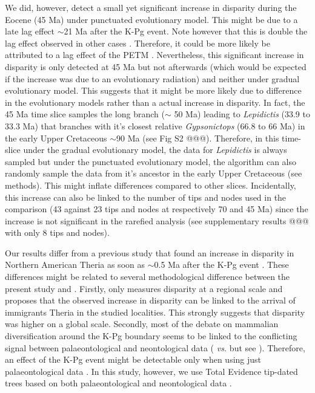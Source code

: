 \documentclass[12pt,letterpaper]{article}
\begin{document}
We did, however, detect a small yet significant increase in disparity during the Eocene (45 Ma) under punctuated evolutionary model.
This might be due to a late lag effect $\sim$21 Ma after the K-Pg event.
Note however that this is double the lag effect observed in other cases \citep{chen2012timing}.
Therefore, it could be more likely be attributed to a lag effect of the PETM \citep[$\sim$ 11 Ma afterwards;][]{bininda2007delayed}.
Nevertheless, this significant increase in disparity is only detected at 45 Ma but not afterwards (which would be expected if the increase was due to an evolutionary radiation) and neither under gradual evolutionary model.
This suggests that it might be more likely due to difference in the evolutionary models rather than a actual increase in disparity.
In fact, the 45 Ma time slice %
 samples the long branch ($\sim$ 50 Ma) leading to \textit{Lepidictis} (33.9 to 33.3 Ma) that branches with it's closest relative \textit{Gypsonictops} (66.8 to 66 Ma) in the early Upper Cretaceous $\sim$90 Ma (see Fig S2 @@@).
Therefore, in this time-slice under the gradual evolutionary model, the data for \textit{Lepidictis} is always sampled but under the punctuated evolutionary model, the algorithm can also randomly sample the data from it's ancestor in the early Upper Cretaceous (see methods).
This might inflate differences compared to other slices.
Incidentally, this increase can also be linked to the number of tips and nodes used in the comparison (43 against 23 tips and nodes at respectively 70 and 45 Ma) since the increase is not significant in the rarefied analysis (see supplementary results @@@ with only 8 tips and nodes).

Our results differ from a previous study that found an increase in disparity in Northern American Theria as soon as $\sim$0.5 Ma after the K-Pg event \citep{Wilson2013}.
These differences might be related to several methodological difference between the present study and \cite{Wilson2013}.
Firstly, \cite{Wilson2013} only measures disparity at a regional scale and proposes that the observed increase in disparity can be linked to the arrival of immigrants Theria in the studied localities.
This strongly suggests that disparity was higher on a global scale.
Secondly, most of the debate on mammalian diversification around the K-Pg boundary seems to be linked to the conflicting signal between palaeontological and neontological data (\citealt{meredithimpacts2011} \textit{vs.} \citealt{O'Leary08022013} but see \citealt{dosReis2014}).
Therefore, an effect of the K-Pg event might be detectable only when using just palaeontological data \citep{Wilson2013}.
In this study, however, we use Total Evidence tip-dated trees based on both palaeontological and neontological data \citep{Slater2012MEE,beckancient2014}.
\end{document}
